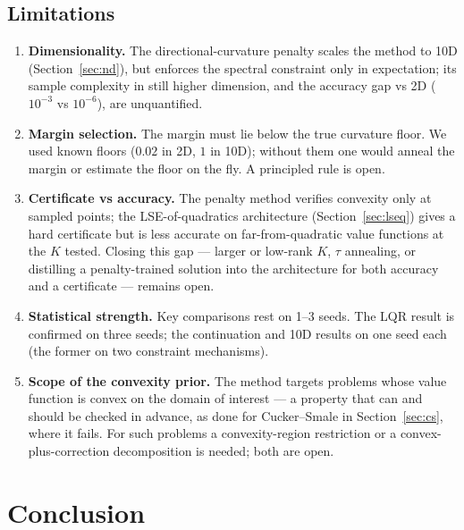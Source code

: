\documentclass[11pt,a4paper]{article}
\begin{document}
\subsection{Limitations}
\begin{enumerate}[itemsep=1pt]
  \item \textbf{Dimensionality.} The directional-curvature penalty scales
        the method to 10D (Section~\ref{sec:nd}), but enforces the spectral
        constraint only in expectation; its sample complexity in still
        higher dimension, and the accuracy gap vs 2D ($10^{-3}$ vs
        $10^{-6}$), are unquantified.
  \item \textbf{Margin selection.} The margin must lie below the true
        curvature floor. We used known floors ($0.02$ in 2D, $1$ in 10D);
        without them one would anneal the margin or estimate the floor on
        the fly. A principled rule is open.
  \item \textbf{Certificate vs accuracy.} The penalty method verifies
        convexity only at sampled points; the LSE-of-quadratics architecture
        (Section~\ref{sec:lseq}) gives a hard certificate but is less
        accurate on far-from-quadratic value functions at the $K$ tested.
        Closing this gap --- larger or low-rank $K$, $\tau$ annealing, or
        distilling a penalty-trained solution into the architecture for both
        accuracy and a certificate --- remains open.
  \item \textbf{Statistical strength.} Key comparisons rest on 1--3 seeds.
        The LQR result is confirmed on three seeds; the continuation and
        10D results on one seed each (the former on two constraint
        mechanisms).
  \item \textbf{Scope of the convexity prior.} The method targets problems
        whose value function is convex on the domain of interest --- a
        property that can and should be checked in advance, as done for
        Cucker--Smale in Section~\ref{sec:cs}, where it fails. For such
        problems a convexity-region restriction or a convex-plus-correction
        decomposition is needed; both are open.
\end{enumerate}

\section{Conclusion}
\end{document}
